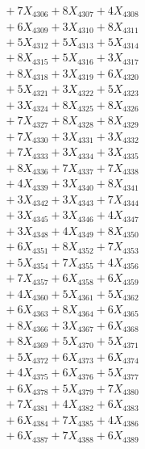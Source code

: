 \documentclass[a4paper,10pt]{article}
\begin{document}
{\begin{align}
&\;  + 7 X_{4306} + 8 X_{4307} + 4 X_{4308} \\[0.3ex]
&\;  + 6 X_{4309} + 3 X_{4310} + 8 X_{4311} \\[0.3ex]
&\;  + 5 X_{4312} + 5 X_{4313} + 5 X_{4314} \\[0.3ex]
&\;  + 8 X_{4315} + 5 X_{4316} + 3 X_{4317} \\[0.3ex]
&\;  + 8 X_{4318} + 3 X_{4319} + 6 X_{4320} \\[0.3ex]
&\;  + 5 X_{4321} + 3 X_{4322} + 5 X_{4323} \\[0.3ex]
&\;  + 3 X_{4324} + 8 X_{4325} + 8 X_{4326} \\[0.3ex]
&\;  + 7 X_{4327} + 8 X_{4328} + 8 X_{4329} \\[0.5ex]\allowbreak
&\;  + 7 X_{4330} + 3 X_{4331} + 3 X_{4332} \\[0.3ex]
&\;  + 7 X_{4333} + 3 X_{4334} + 3 X_{4335} \\[0.3ex]
&\;  + 8 X_{4336} + 7 X_{4337} + 7 X_{4338} \\[0.3ex]
&\;  + 4 X_{4339} + 3 X_{4340} + 8 X_{4341} \\[0.3ex]
&\;  + 3 X_{4342} + 3 X_{4343} + 7 X_{4344} \\[0.3ex]
&\;  + 3 X_{4345} + 3 X_{4346} + 4 X_{4347} \\[0.3ex]
&\;  + 3 X_{4348} + 4 X_{4349} + 8 X_{4350} \\[0.3ex]
&\;  + 6 X_{4351} + 8 X_{4352} + 7 X_{4353} \\[0.3ex]
&\;  + 5 X_{4354} + 7 X_{4355} + 4 X_{4356} \\[0.3ex]
&\;  + 7 X_{4357} + 6 X_{4358} + 6 X_{4359} \\[0.5ex]\allowbreak
&\;  + 4 X_{4360} + 5 X_{4361} + 5 X_{4362} \\[0.3ex]
&\;  + 6 X_{4363} + 8 X_{4364} + 6 X_{4365} \\[0.3ex]
&\;  + 8 X_{4366} + 3 X_{4367} + 6 X_{4368} \\[0.3ex]
&\;  + 8 X_{4369} + 5 X_{4370} + 5 X_{4371} \\[0.3ex]
&\;  + 5 X_{4372} + 6 X_{4373} + 6 X_{4374} \\[0.3ex]
&\;  + 4 X_{4375} + 6 X_{4376} + 5 X_{4377} \\[0.3ex]
&\;  + 6 X_{4378} + 5 X_{4379} + 7 X_{4380} \\[0.3ex]
&\;  + 7 X_{4381} + 4 X_{4382} + 6 X_{4383} \\[0.3ex]
&\;  + 6 X_{4384} + 7 X_{4385} + 4 X_{4386} \\[0.3ex]
&\;  + 6 X_{4387} + 7 X_{4388} + 6 X_{4389} \\[0.5ex]\allowbreak

\end{align}}
\end{document}
